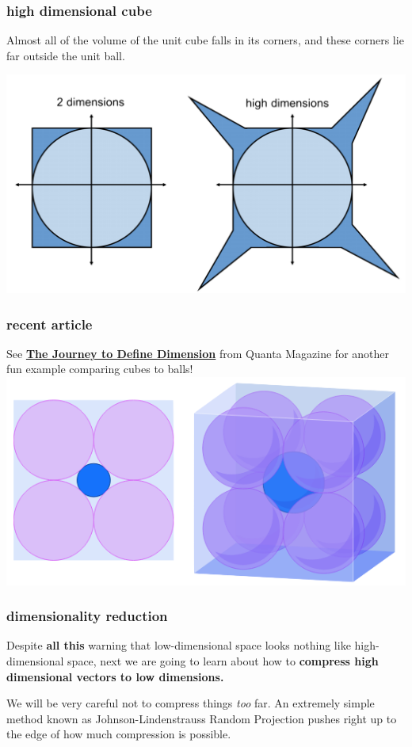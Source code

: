 \documentclass[compress]{beamer}
\begin{document}
\begin{frame}
	\frametitle{high dimensional cube}
	Almost all of the volume of the unit cube falls in its corners, and these corners lie far outside the unit ball. 
\begin{center}
\includegraphics[width=.7\textwidth]{highdcube.png}
\end{center}
\end{frame}

\begin{frame}
	\frametitle{recent article}
	\begin{center}
	See \textbf{\textcolor{blue}{\href{https://www.quantamagazine.org/a-mathematicians-guided-tour-through-high-dimensions-20210913/}{The Journey to Define Dimension}}} from Quanta Magazine for another fun example comparing cubes to balls!
	\vspace{1em}
	\includegraphics[width=.6\textwidth]{quanta.png}
	\end{center}
\end{frame}

\begin{frame}
	\frametitle{dimensionality reduction}
	Despite \textbf{all this} warning that low-dimensional space looks nothing like high-dimensional space, next we are going to learn about how to \textbf{compress high dimensional vectors to low dimensions.} 
	
	We will be very careful not to compress things \emph{too} far. An extremely simple method known as Johnson-Lindenstrauss Random Projection pushes right up to the edge of how much compression is possible. 
\end{frame}
\end{document}
